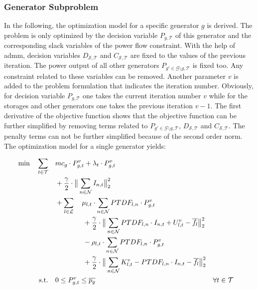 \subsubsection*{Generator Subproblem}

In the following, the optimization model for a specific generator $g$ is derived. The problem is only optimized by the decision variable $P_{g,\mathcal{T}}$ of this generator and the corresponding slack variables of the power flow constraint. With the help of \gls{admm}, decision variables $D_{\mathcal{S},\mathcal{T}}$ and $C_{\mathcal{S},\mathcal{T}}$ are fixed to the values of the previous iteration. The power output of all other generators $P_{g' \in \mathcal{G}\setminus g,\mathcal{T}}$ is fixed too. Any constraint related to these variables can be removed. Another parameter $v$ is added to the problem formulation that indicates the iteration number. Obviously, for decision variable $P_{g,\mathcal{T}}$ one takes the current iteration number $v$ while for the storages and other generators one takes the previous iteration $v-1$. The first derivative of the objective function shows that the objective function can be further simplified by removing terms related to $P_{g' \in \mathcal{G}\setminus g,\mathcal{T}}$, $D_{\mathcal{S},\mathcal{T}}$ and $C_{\mathcal{S},\mathcal{T}}$. The penalty terms can not be further simplified because of the second order norm. The optimization model for a single generator yields:

\begin{subequations}
	\begin{align}
		 \min \quad \sum_{t\in\mathcal{T}} \quad & mc_g \cdot P_{g,t}^v + \lambda_t \cdot P_{g,t}^v \label{eq:sub:gen}\\
		 & + \frac{\gamma}{2} \cdot \big\| \sum_{n \in \mathcal{N}} I_{n,t} \big\|^2_2 \nonumber \\
		 & + \sum_{l \in \mathcal{L}} \quad \mu_{l,t} \cdot \sum_{n \in \mathcal{N}} PTDF_{l,n} \cdot P_{g,t}^v \nonumber \\
		 & \qquad \qquad + \frac{\gamma}{2} \cdot \big\| \sum_{n \in \mathcal{N}} PTDF_{l,n} \cdot I_{n,t} + U_{l,t}^v - \overline{f_l} \big\|^2_2 \nonumber \\
		 & \qquad \qquad - \rho_{l,t} \cdot \sum_{n \in \mathcal{N}} PTDF_{l,n} \cdot P_{g,t}^v \nonumber \\
		 & \qquad \qquad + \frac{\gamma}{2} \cdot \big\| \sum_{n \in \mathcal{N}} K_{l,t}^v - PTDF_{l,n} \cdot I_{n,t} - \overline{f_l} \big\|^2_2 \nonumber \\
		 \text{s.t.} \quad & 0 \leq P_{g,t}^v \leq \overline{p_g} && \forall t \in \mathcal{T}
	\end{align}
\end{subequations}


